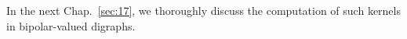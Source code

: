 \vspace{\baselineskip}
In the next Chap.~\ref{sec:17}, we thoroughly discuss the computation of such kernels in bipolar-valued digraphs.


%
%
